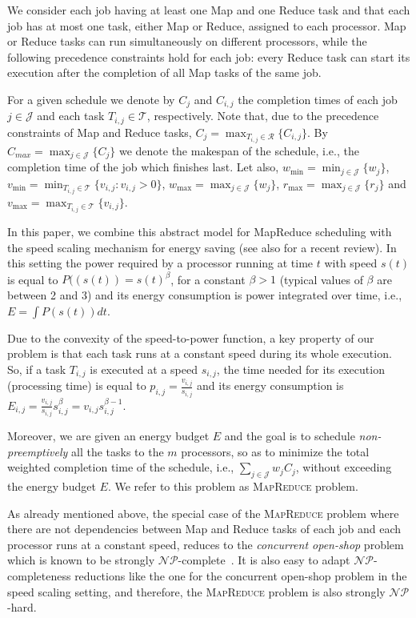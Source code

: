 \documentclass{llncs}
\newcommand{\mr}{\textsc{MapReduce}\xspace}
\begin{document}
We consider each job having at least one Map and one Reduce task and
that each job  has at most one task, either Map or Reduce, assigned to each processor.
Map or Reduce tasks can run simultaneously on different processors, while the following precedence constraints hold for each job:
every Reduce task can start its execution after the completion of all Map tasks of the same job.

For a given schedule we denote by  $C_j$ and $C_{i,j}$ the completion times of each
job $j \in \mathcal{J}$ and each  task $T_{i,j} \in \mathcal{T}$, respectively.
Note that, due to the precedence constraints of Map and Reduce tasks, $C_j = \max_{T_{i,j}\in\mathcal{R}} \{C_{i,j}\}$.
By $C_{max}=\max_{j \in \mathcal{J}} \{C_j\}$ we denote the makespan of the schedule, i.e., the completion time of the job which finishes last.
Let also, $w_{\min}=\min_{j \in \mathcal{J}} \{w_j\}$, $v_{\min}=\min_{T_{i,j} \in \mathcal{T}} \{v_{i,j}: v_{i,j}>0\}$,
$w_{\max}=\max_{j \in \mathcal{J}} \{w_j\}$, $r_{\max}=\max_{j \in \mathcal{J}} \{r_j\}$ and $v_{\max}=\max_{T_{i,j} \in \mathcal{T}} \{v_{i,j}\}$.

In this paper, we combine this abstract model for MapReduce scheduling with the speed scaling mechanism for energy saving \cite{YaoDS95}
(see also \cite{Albers11} for a recent review).
In this setting the power required by a processor running at time $t$ with speed  $s(t)$
is equal to $P((s(t))=s(t)^\beta$, for a constant $\beta>1$ (typical values of $\beta$ are between 2 and 3)
and its energy consumption  is power integrated over  time, i.e., $E=\int P(s(t)) dt$.


Due to the convexity of the speed-to-power function,
a key property of our problem is that each task runs at a constant speed during its whole execution.
So, if a task $T_{i,j}$ is executed at a speed $s_{i,j}$, the time needed for
its execution (processing time) is equal to
$p_{i,j}=\frac{v_{i,j}}{s_{i,j}}$ and its energy consumption is
$E_{i,j}= \frac{v_{i,j}}{s_{i,j}}s_{i,j}^{\beta}=v_{i,j}s_{i,j}^{\beta-1}$.

Moreover, we are given an energy budget $E$ and the goal is to schedule \emph{non-preemptively} all the tasks to the $m$ processors,
so as to minimize the total weighted completion time of the schedule, i.e., $\sum_{j\in\mathcal{J}}w_j C_j$, without exceeding the energy budget $E$.
We refer to this problem as \mr problem.

As already mentioned above, the special case of the \mr problem where there are not dependencies between Map and Reduce tasks of each job
and each processor runs at a constant speed, reduces to the \emph{concurrent open-shop} problem which is known to be strongly $\mathcal{NP}$-complete~\cite{Roemer06}.
It is also easy to adapt $\mathcal{NP}$-completeness reductions like the one for the concurrent open-shop problem in the speed scaling setting,
and therefore, the \mr problem is also strongly $\mathcal{NP}$-hard.
\end{document}
